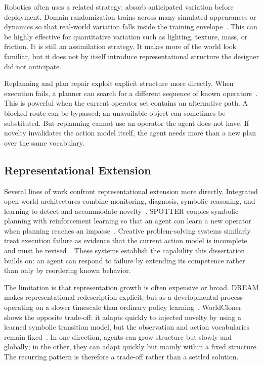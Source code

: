 Robotics often uses a related strategy: absorb anticipated variation before deployment.
Domain randomization trains across many simulated appearances or dynamics so that real-world variation falls inside the training envelope~\citep{tobin2017domain,peng2018sim}.
This can be highly effective for quantitative variation such as lighting, texture, mass, or friction.
It is still an assimilation strategy.
It makes more of the world look familiar, but it does not by itself introduce representational structure the designer did not anticipate.

Replanning and plan repair exploit explicit structure more directly.
When execution fails, a planner can search for a different sequence of known operators~\citep{fox2006plan,fritz2007monitoring}.
This is powerful when the current operator set contains an alternative path.
A blocked route can be bypassed; an unavailable object can sometimes be substituted.
But replanning cannot use an operator the agent does not have.
If novelty invalidates the action model itself, the agent needs more than a new plan over the same vocabulary.

\subsection{Representational Extension}
\label{sec:extend_representation_methods}

Several lines of work confront representational extension more directly.
Integrated open-world architectures combine monitoring, diagnosis, symbolic reasoning, and learning to detect and accommodate novelty~\citep{muhammad2021novelty,goel2024neurosymbolic}.
SPOTTER couples symbolic planning with reinforcement learning so that an agent can learn a new operator when planning reaches an impasse~\citep{sarathy2021spotter}.
Creative problem-solving systems similarly treat execution failure as evidence that the current action model is incomplete and must be revised~\citep{gizzi2019creative,gizzi2022cps}.
These systems establish the capability this dissertation builds on: an agent can respond to failure by extending its competence rather than only by reordering known behavior.

The limitation is that representation growth is often expensive or broad.
DREAM makes representational redescription explicit, but as a developmental process operating on a slower timescale than ordinary policy learning~\citep{doncieux2020dream}.
WorldCloner shows the opposite trade-off: it adapts quickly to injected novelty by using a learned symbolic transition model, but the observation and action vocabularies remain fixed~\citep{balloch2023neuro}.
In one direction, agents can grow structure but slowly and globally; in the other, they can adapt quickly but mainly within a fixed structure.
The recurring pattern is therefore a trade-off rather than a settled solution.

